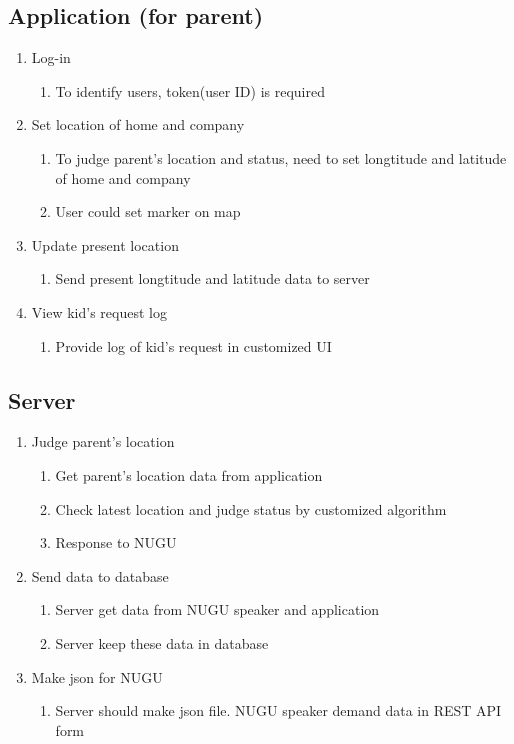 \documentclass[conference]{IEEEtran}
\begin{document}
\subsection{Application (for parent)}
\begin{enumerate}
    \item Log-in
    \begin{enumerate}
        \item To identify users, token(user ID) is required
    \end{enumerate}
    \item Set location of home and company
    \begin{enumerate}
        \item To judge parent’s location and status, need to set longtitude and latitude of home and company
        \item User could set marker on map
    \end{enumerate}
    \item Update present location
    \begin{enumerate}
        \item Send present longtitude and latitude data to server
    \end{enumerate}
    \item View kid’s request log
    \begin{enumerate}
        \item Provide log of kid’s request in customized UI
    \end{enumerate}
\end{enumerate}

\subsection{Server}
\begin{enumerate}
    \item Judge parent’s location
    \begin{enumerate}
        \item Get parent’s location data from application
        \item Check latest location and judge status by customized algorithm
        \item Response to NUGU
    \end{enumerate}
    \item Send data to database
    \begin{enumerate}
        \item Server get data from NUGU speaker and application
        \item Server keep these data in database
    \end{enumerate}
    \item Make json for NUGU
    \begin{enumerate}
        \item Server should make json file. NUGU speaker demand data in REST API form\\
    \end{enumerate}
\end{enumerate}
\end{document}

